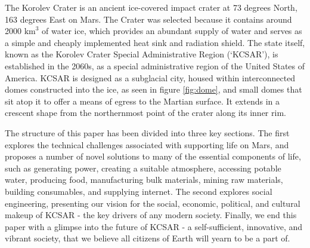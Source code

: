 \documentclass[fleqn,10pt]{Stylesheet} %
\begin{document}
The Korolev Crater is an ancient ice-covered impact crater at 73 degrees North, 163 degrees East on Mars. The Crater was selected because it contains around 2000 $\text{km}^{3}$ of water ice, which provides an abundant supply of water and serves as a simple and cheaply implemented heat sink and radiation shield. The state itself, known as the Korolev Crater Special Administrative Region (‘KCSAR’), is established in the 2060s, as a special administrative region of the United States of America. KCSAR is designed as a subglacial city, housed within interconnected domes constructed into the ice, as seen in figure \ref{fig:dome}, and small domes that sit atop it to offer a means of egress to the Martian surface. It extends in a crescent shape from the northernmost point of the crater along its inner rim.

The structure of this paper has been divided into three key sections. The first explores the technical challenges associated with supporting life on Mars, and proposes a number of novel solutions to many of the essential components of life, such as generating power, creating a suitable atmosphere, accessing potable water, producing food, manufacturing bulk materials, mining raw materials, building consumables, and supplying internet. The second explores social engineering, presenting our vision for the social, economic, political, and cultural makeup of KCSAR - the key drivers of any modern society. Finally, we end this paper with a glimpse into the future of KCSAR - a self-sufficient, innovative, and vibrant society, that we believe all citizens of Earth will yearn to be a part of.
\end{document}
